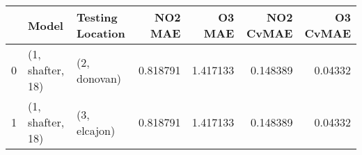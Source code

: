 \begin{tabular}{lllrrrr}
\toprule
{} &             Model & Testing Location &   NO2 MAE &    O3 MAE &  NO2 CvMAE &  O3 CvMAE \\
\midrule
0 &  (1, shafter, 18) &     (2, donovan) &  0.818791 &  1.417133 &   0.148389 &   0.04332 \\
1 &  (1, shafter, 18) &     (3, elcajon) &  0.818791 &  1.417133 &   0.148389 &   0.04332 \\
\bottomrule
\end{tabular}
